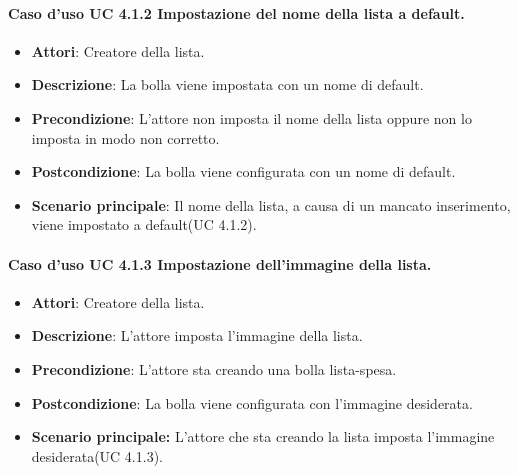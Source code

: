 \paragraph{Caso d'uso UC 4.1.2 Impostazione del nome della lista a default.}
	\begin{itemize}
	\item\textbf{Attori}: Creatore della lista.
		\item\textbf{Descrizione}: La bolla viene impostata con un nome di default.
		\item\textbf{Precondizione}: L'attore non imposta il nome della lista oppure non lo imposta in modo non corretto.
		\item\textbf{Postcondizione}: La bolla viene configurata con un nome di default.
		\item\textbf{Scenario principale}: Il nome della lista, a causa di un mancato inserimento, viene impostato a default(UC 4.1.2).
		
	\end{itemize}
	
	
\paragraph{Caso d'uso UC 4.1.3 Impostazione dell'immagine della lista.}
	\begin{itemize}
	\item\textbf{Attori}: Creatore della lista.
		\item\textbf{Descrizione}: L'attore imposta l'immagine della lista.
		\item\textbf{Precondizione}: L'attore sta creando una bolla lista-spesa.
		\item\textbf{Postcondizione}: La bolla viene configurata con l'immagine desiderata.
		
		\item\textbf{Scenario principale:} L'attore che sta creando la lista imposta l'immagine desiderata(UC 4.1.3).
		
		
	\end{itemize}
	